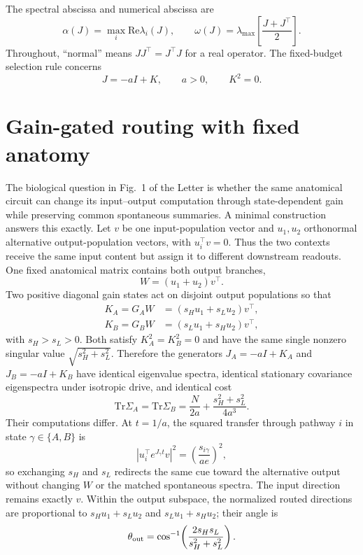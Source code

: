 \documentclass[
  aps,prl,preprint,notitlepage,superscriptaddress,nofootinbib,longbibliography,
  amsmath,amssymb
]{revtex4-2}
\newcommand{\Tr}{\mathrm{Tr}}
\newcommand{\Rey}{\mathrm{Re}}
\begin{document}
The spectral abscissa and numerical abscissa are
\begin{equation}
\alpha(J)=\max_i\Rey\lambda_i(J),\qquad
\omega(J)=\lambda_{\max}\!\left[\frac{J+J^\top}{2}\right].
\end{equation}
Throughout, ``normal'' means $JJ^\top=J^\top J$ for a real operator.
The fixed-budget selection rule concerns
\begin{equation}
J=-aI+K,\qquad a>0,\qquad K^2=0.
\label{eq:s-class}
\end{equation}

\section{Gain-gated routing with fixed anatomy}
\label{sec:s-gain-routing}

The biological question in Fig.~1 of the Letter is whether the same anatomical
circuit can change its input--output computation through state-dependent gain
while preserving common spontaneous summaries. A minimal construction answers
this exactly. Let $v$ be one input-population vector and $u_1,u_2$ orthonormal
alternative output-population vectors, with $u_i^\top v=0$.  Thus the two
contexts receive the same input content but assign it to different downstream
readouts. One fixed anatomical matrix contains both output branches,
\begin{equation}
W=(u_1+u_2)v^\top .
\label{eq:s-routing-anatomy}
\end{equation}
Two positive diagonal gain states act on disjoint output populations so that
\begin{align}
K_A=G_AW&=(s_Hu_1+s_Lu_2)v^\top,\\
K_B=G_BW&=(s_Lu_1+s_Hu_2)v^\top,
\label{eq:s-routing-states}
\end{align}
with $s_H>s_L>0$. Both satisfy $K_A^2=K_B^2=0$ and have the same single
nonzero singular value $\sqrt{s_H^2+s_L^2}$. Therefore the generators
$J_A=-aI+K_A$ and $J_B=-aI+K_B$ have identical eigenvalue spectra, identical
stationary covariance eigenspectra under isotropic drive, and identical cost
\begin{equation}
\Tr\Sigma_A=\Tr\Sigma_B
=\frac{N}{2a}+\frac{s_H^2+s_L^2}{4a^3}.
\label{eq:s-routing-cost}
\end{equation}
Their computations differ. At $t=1/a$, the squared transfer through pathway
$i$ in state $\gamma\in\{A,B\}$ is
\begin{equation}
\left|u_i^\top e^{J_\gamma t}v\right|^2
=\left(\frac{s_{i\gamma}}{ae}\right)^2,
\label{eq:s-routing-transfer}
\end{equation}
so exchanging $s_H$ and $s_L$ redirects the same cue toward the alternative
output without changing $W$ or the matched spontaneous spectra. The input
direction remains exactly $v$.  Within the output subspace, the normalized
routed directions are proportional to $s_Hu_1+s_Lu_2$ and
$s_Lu_1+s_Hu_2$; their angle is
\begin{equation}
\theta_{\rm out}=\cos^{-1}\!\left(
\frac{2s_Hs_L}{s_H^2+s_L^2}\right).
\label{eq:s-routing-angle}
\end{equation}
\end{document}
